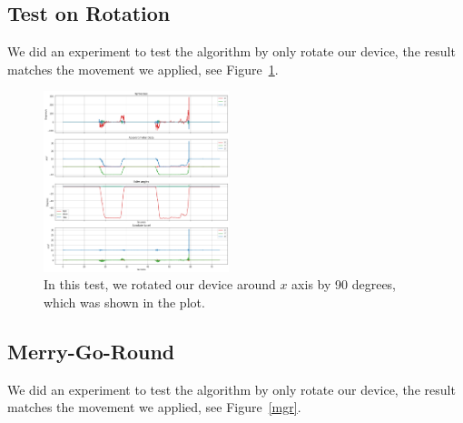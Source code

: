 \documentclass[%
 reprint,
 amsmath,amssymb,
 aps,
]{revtex4-2}
\begin{document}
\newpage

\subsection{Test on Rotation}
We did an experiment to test the algorithm by only rotate our device, the result matches the movement we applied, see Figure~\ref{rotation}. 

\begin{figure}[H]
\includegraphics[width=0.48\textwidth]{rotation.png}
\caption{\label{rotation}In this test, we rotated our device around $x$ axis by 90 degrees, which was shown in the plot.}
\end{figure}

\subsection{Merry-Go-Round}
We did an experiment to test the algorithm by only rotate our device, the result matches the movement we applied, see Figure~\ref{mgr}.
\end{document}
